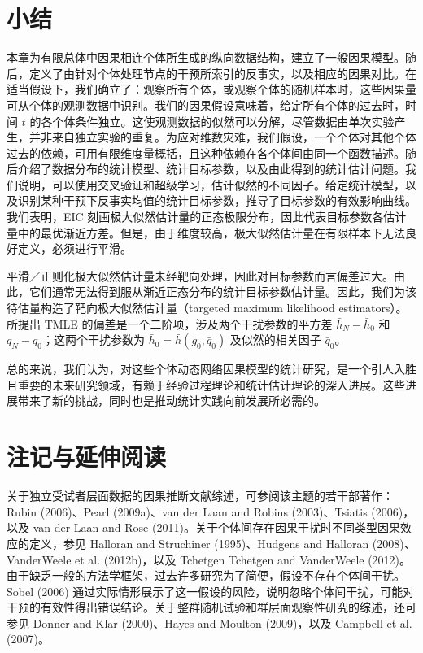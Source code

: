 \section{小结}

本章为有限总体中因果相连个体所生成的纵向数据结构，建立了一般因果模型。随后，定义了由针对个体处理节点的干预所索引的反事实，以及相应的因果对比。在适当假设下，我们确立了：观察所有个体，或观察个体的随机样本时，这些因果量可从个体的观测数据中识别。我们的因果假设意味着，给定所有个体的过去时，时间 $t$ 的各个体条件独立。这使观测数据的似然可以分解，尽管数据由单次实验产生，并非来自独立实验的重复。为应对维数灾难，我们假设，一个个体对其他个体过去的依赖，可用有限维度量概括，且这种依赖在各个体间由同一个函数描述。随后介绍了数据分布的统计模型、统计目标参数，以及由此得到的统计估计问题。我们说明，可以使用交叉验证和超级学习，估计似然的不同因子。给定统计模型，以及识别某种干预下反事实均值的统计目标参数，推导了目标参数的有效影响曲线。我们表明，EIC 刻画极大似然估计量的正态极限分布，因此代表目标参数各估计量中的最优渐近方差。但是，由于维度较高，极大似然估计量在有限样本下无法良好定义，必须进行平滑。

平滑／正则化极大似然估计量未经靶向处理，因此对目标参数而言偏差过大。由此，它们通常无法得到服从渐近正态分布的统计目标参数估计量。因此，我们为该待估量构造了靶向极大似然估计量（targeted maximum likelihood estimators）。所提出 TMLE 的偏差是一个二阶项，涉及两个干扰参数的平方差 $\bar h_N-\bar h_0$ 和 $q_N-q_0$；这两个干扰参数为 $\bar h_0=\bar h(\bar g_0,\bar q_0)$ 及似然的相关因子 $\bar q_0$。

总的来说，我们认为，对这些个体动态网络因果模型的统计研究，是一个引人入胜且重要的未来研究领域，有赖于经验过程理论和统计估计理论的深入进展。这些进展带来了新的挑战，同时也是推动统计实践向前发展所必需的。

\section{注记与延伸阅读}

关于独立受试者层面数据的因果推断文献综述，可参阅该主题的若干部著作：Rubin (2006)、Pearl (2009a)、van der Laan and Robins (2003)、Tsiatis (2006)，以及 van der Laan and Rose (2011)。关于个体间存在因果干扰时不同类型因果效应的定义，参见 Halloran and Struchiner (1995)、Hudgens and Halloran (2008)、VanderWeele et al. (2012b)，以及 Tchetgen Tchetgen and VanderWeele (2012)。由于缺乏一般的方法学框架，过去许多研究为了简便，假设不存在个体间干扰。Sobel (2006) 通过实际情形展示了这一假设的风险，说明忽略个体间干扰，可能对干预的有效性得出错误结论。关于整群随机试验和群层面观察性研究的综述，还可参见 Donner and Klar (2000)、Hayes and Moulton (2009)，以及 Campbell et al. (2007)。

